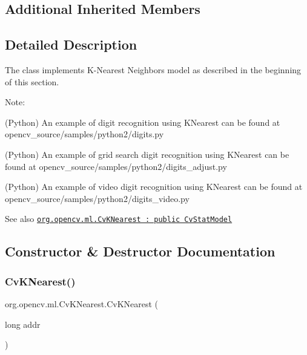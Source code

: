 \subsection*{Additional Inherited Members}


\subsection{Detailed Description}
The class implements K-\/\+Nearest Neighbors model as described in the beginning of this section.

Note\+:


\begin{DoxyItemize}
\item (Python) An example of digit recognition using K\+Nearest can be found at opencv\+\_\+source/samples/python2/digits.\+py 
\item (Python) An example of grid search digit recognition using K\+Nearest can be found at opencv\+\_\+source/samples/python2/digits\+\_\+adjust.\+py 
\item (Python) An example of video digit recognition using K\+Nearest can be found at opencv\+\_\+source/samples/python2/digits\+\_\+video.\+py 
\end{DoxyItemize}

\begin{DoxySeeAlso}{See also}
\href{http://docs.opencv.org/modules/ml/doc/k_nearest_neighbors.html#cvknearest}{\tt org.\+opencv.\+ml.\+Cv\+K\+Nearest \+: public Cv\+Stat\+Model} 
\end{DoxySeeAlso}


\subsection{Constructor \& Destructor Documentation}
\mbox{\label{classorg_1_1opencv_1_1ml_1_1_cv_k_nearest_a101ba1d24437af035d8fbb695256c16d}} 
\subsubsection{\texorpdfstring{Cv\+K\+Nearest()}{CvKNearest()}\hspace{0.1cm}{\footnotesize\ttfamily [1/4]}}
{\footnotesize\ttfamily org.\+opencv.\+ml.\+Cv\+K\+Nearest.\+Cv\+K\+Nearest (\begin{DoxyParamCaption}\item[{long}]{addr }\end{DoxyParamCaption})\hspace{0.3cm}{\ttfamily [protected]}}

